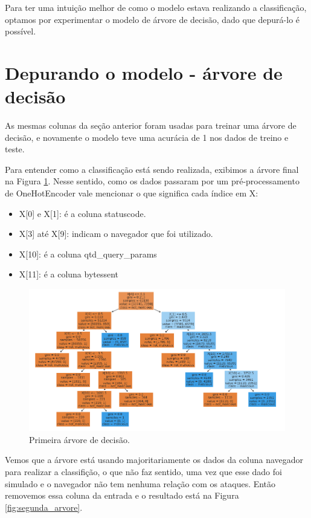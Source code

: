 Para ter uma intuição melhor de como o modelo estava realizando a classificação, optamos por experimentar 
o modelo de árvore de decisão, dado que depurá-lo é possível.

\section{Depurando o modelo - árvore de decisão}

As mesmas colunas da seção anterior foram usadas para treinar uma árvore de decisão, e novamente
o modelo teve uma acurácia de 1 nos dados de treino e teste. 

Para entender como a classificação está sendo realizada, exibimos a árvore final na Figura \ref{fig:primeira_arvore}. Nesse sentido, 
como os dados passaram por um pré-processamento de OneHotEncoder vale mencionar o que significa cada índice em X:

\begin{itemize}
    \item X[0] e X[1]: é a coluna statuscode.
    \item X[3] até X[9]: indicam o navegador que foi utilizado.
    \item X[10]: é a coluna qtd\_query\_params
    \item X[11]: é a coluna bytessent
\end{itemize}

\begin{figure}
    \centering
    \includegraphics[width=.9\textwidth]{figuras/primeira-arvore.png}
    \caption{Primeira árvore de decisão. \label{fig:primeira_arvore}}    
\end{figure}

Vemos que a árvore está usando majoritariamente os dados da coluna navegador 
para realizar a classifição, o que não faz sentido, uma vez que esse dado foi simulado e o 
navegador não tem nenhuma relação com os ataques. Então removemos essa coluna da entrada 
e o resultado está na Figura \ref{fig:segunda_arvore}.


